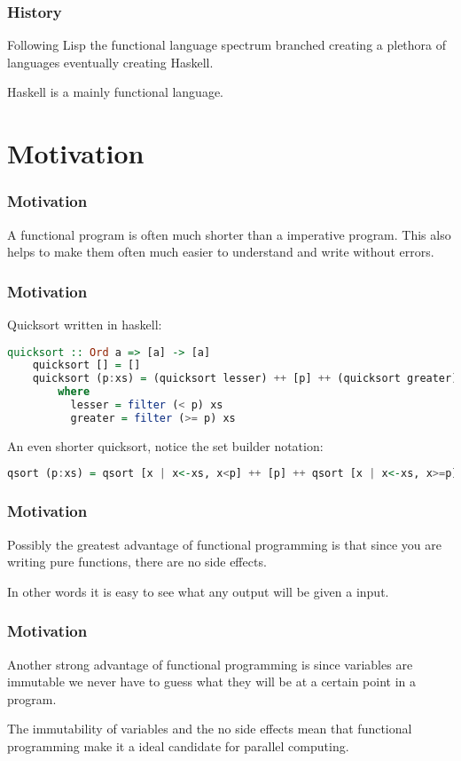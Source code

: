 \documentclass[presentation.tex]{subfiles}
\begin{document}
\begin{frame}
  \frametitle{History}
  Following Lisp the functional language spectrum branched creating a plethora of languages eventually creating Haskell.

  \vspace{\baselineskip}
  Haskell is a mainly functional language.
\end{frame}


\section{Motivation}
\begin{frame}
  \frametitle{Motivation}
  A functional program is often much shorter than a imperative program. This also helps to make them often much easier to understand and write without errors.
\end{frame}


\begin{frame}[fragile]
  \frametitle{Motivation}
  Quicksort written in haskell:
  \begin{lstlisting}[language=Haskell]
    quicksort :: Ord a => [a] -> [a]
    quicksort [] = []
    quicksort (p:xs) = (quicksort lesser) ++ [p] ++ (quicksort greater)
        where
          lesser = filter (< p) xs
          greater = filter (>= p) xs
  \end{lstlisting}

  \vspace{\baselineskip}
  An even shorter quicksort, notice the set builder notation:
  \begin{lstlisting}[language=Haskell]
    qsort (p:xs) = qsort [x | x<-xs, x<p] ++ [p] ++ qsort [x | x<-xs, x>=p]
  \end{lstlisting}
\end{frame}


\begin{frame}
  \frametitle{Motivation}
  Possibly the greatest advantage of functional programming is that since you are writing pure functions, there are no side effects.

  \vspace{\baselineskip}
  In other words it is easy to see what any output will be given a input.
\end{frame}


\begin{frame}
  \frametitle{Motivation}
  Another strong advantage of functional programming is since variables are immutable we never have to guess what they will be at a certain point in a program.

  \vspace{\baselineskip}
  The immutability of variables and the no side effects mean that functional programming make it a ideal candidate for parallel computing.
\end{frame}
\end{document}
